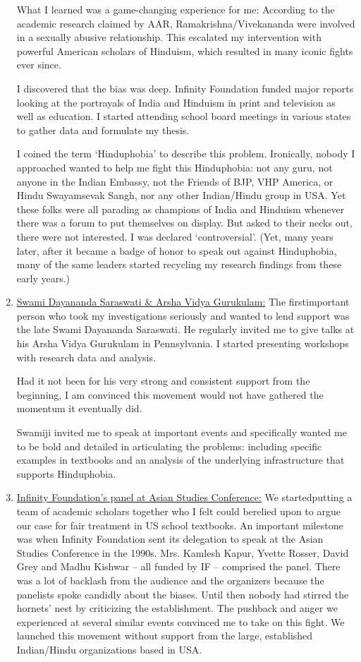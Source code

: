 \begin{enumerate}
What I learned was a game-changing experience for me: According to the academic research claimed by AAR, Ramakrishna/Vivekananda were involved in a sexually abusive relationship. This escalated my intervention with powerful American scholars of Hinduism, which resulted in many iconic fights ever since.

I discovered that the bias was deep. Infinity Foundation funded major reports looking at the portrayals of India and Hinduism in print and television as well as education. I started attending school board meetings in various states to gather data and formulate my thesis.

I coined the term ‘Hinduphobia’ to describe this problem. Ironically, nobody I approached wanted to help me fight this Hinduphobia: not any guru, not anyone in the Indian Embassy, not the Friends of BJP, VHP America, or Hindu Swayamsevak Sangh, nor any other Indian/Hindu group in USA. Yet these folks were all parading as champions of India and Hinduism whenever there was a forum to put themselves on display. But asked to their necks out, there were not interested. I was declared ‘controversial’. (Yet, many years later, after it became a badge of honor to speak out against Hinduphobia, many of the same leaders started recycling my research findings from these early years.)

\item \underline{Swami Dayananda Saraswati \& Arsha Vidya Gurukulam:} The first\break important person who took my investigations seriously and wanted to lend support was the late Swami Dayananda Saraswati. He regularly invited me to give talks at his Arsha Vidya Gurukulam in Pennsylvania. I started presenting workshops with research data and analysis.

Had it not been for his very strong and consistent support from the beginning, I am convinced this movement would not have gathered the momentum it eventually did.

Swamiji invited me to speak at important events and specifically wanted me to be bold and detailed in articulating the problems: including specific examples in textbooks and an analysis of the underlying infrastructure that supports Hinduphobia.

\item \underline{Infinity Foundation’s panel at Asian Studies Conference:} We started\break putting a team of academic scholars together who I felt could be\break relied upon to argue our case for fair treatment in US school textbooks. An important milestone was when Infinity Foundation sent its delegation to speak at the Asian Studies Conference in the 1990s. Mrs. Kamlesh Kapur, Yvette Rosser, David Grey and Madhu Kishwar – all funded by IF – comprised the panel. There was a lot of backlash from the audience and the organizers because the panelists spoke candidly about the biases. Until then nobody had stirred the hornets’ nest by criticizing the establishment. The pushback and anger we experienced at several similar events convinced me to take on this fight. We launched this movement without support from the large, established Indian/Hindu organizations based in USA.


\end{enumerate}
